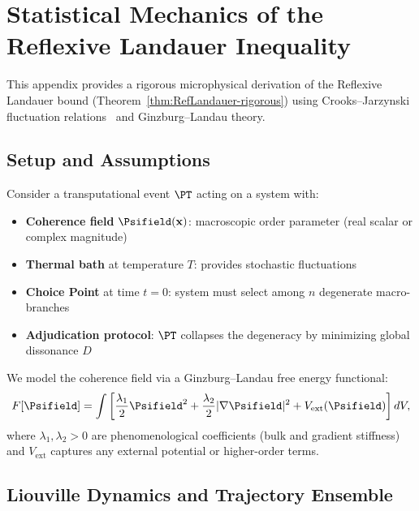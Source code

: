 
\section{Statistical Mechanics of the Reflexive Landauer Inequality}
\label{app:stat-mech-rlb}

This appendix provides a rigorous microphysical derivation of the Reflexive Landauer bound (Theorem~\ref{thm:RefLandauer-rigorous}) using Crooks--Jarzynski fluctuation relations~\cite{Crooks1999,Jarzynski1997} and Ginzburg--Landau theory.

\subsection{Setup and Assumptions}

Consider a transputational event \(\PT\) acting on a system with:
\begin{itemize}[leftmargin=1.2em]
  \item \textbf{Coherence field} \(\Psifield(\mathbf{x})\): macroscopic order parameter (real scalar or complex magnitude)
  \item \textbf{Thermal bath} at temperature \(T\): provides stochastic fluctuations
  \item \textbf{Choice Point} at time \(t=0\): system must select among \(n\) degenerate macro-branches
  \item \textbf{Adjudication protocol}: \(\PT\) collapses the degeneracy by minimizing global dissonance \(D\)
\end{itemize}

We model the coherence field via a Ginzburg--Landau free energy functional:
\begin{equation}
F[\Psifield] = \int \left[ \frac{\lambda_1}{2} \Psifield^2 + \frac{\lambda_2}{2} |\nabla \Psifield|^2 + V_{\mathrm{ext}}(\Psifield) \right] dV,
\end{equation}
where \(\lambda_1,\lambda_2>0\) are phenomenological coefficients (bulk and gradient stiffness) and \(V_{\mathrm{ext}}\) captures any external potential or higher-order terms.

\subsection{Liouville Dynamics and Trajectory Ensemble}

